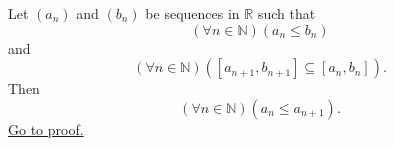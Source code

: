 \begin{lemma}
\label{lem:left-endpoints-nested-intervals-increasing}
Let $(a_n)$ and $(b_n)$ be sequences in $\mathbb{R}$ such that
\[
  (\forall n\in\mathbb{N})(a_n\leq b_n)
\]
and
\[
  (\forall n\in\mathbb{N})([a_{n+1},b_{n+1}]\subseteq [a_n,b_n]).
\]
Then
\[
  (\forall n\in\mathbb{N})(a_n\leq a_{n+1}).
\]
\hyperref[prf:left-endpoints-nested-intervals-increasing]{Go to proof.}
\end{lemma}